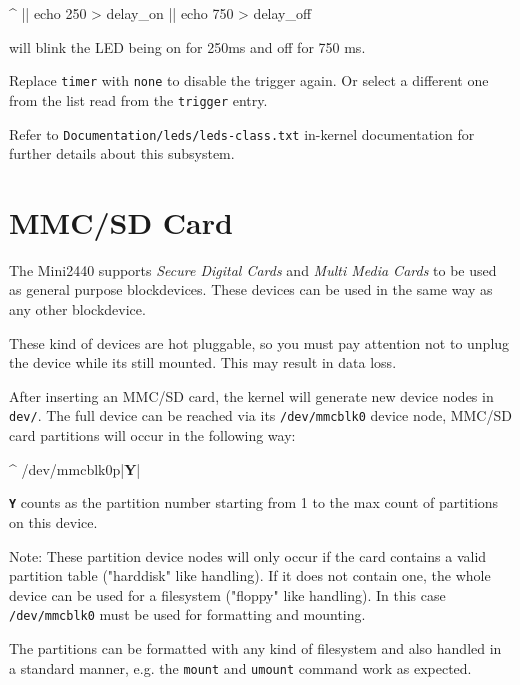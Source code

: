 \begin{ptxshell}[escapechar=|]{^}
|\LedPath| echo 250 > delay_on
|\LedPath| echo 750 > delay_off
\end{ptxshell}

will blink the LED being on for 250ms and off for 750 ms.

Replace \texttt{timer} with \texttt{none} to disable the trigger again. Or
select a different one from the list read from the \texttt{trigger} entry.

Refer to \texttt{Documentation/leds/leds-class.txt} in-kernel documentation for
further details about this subsystem.


\section{MMC/SD Card}					\label{sec:SDC}

The Mini2440 supports \textit{Secure Digital Cards} and
\textit{Multi Media Cards} to be used as general purpose blockdevices. These
devices can be used in the same way as any other blockdevice.

\begin{important}
These kind of devices are hot pluggable, so you must pay attention not to
unplug the device while its still mounted. This may result in data loss.
\end{important}

After inserting an MMC/SD card, the kernel will generate new device nodes in
\texttt{dev/}. The full device can be reached via its \texttt{/dev/mmcblk0}
device node, MMC/SD card partitions will occur in the following way:

\begin{ptxshell}[escapechar=|]{^}
/dev/mmcblk0p|\textbf{Y}|
\end{ptxshell}
\texttt{\textbf{Y}} counts as the partition number starting from 1 to the max
count of partitions on this device.

Note: These partition device nodes will only occur if the card contains a
valid partition table ("harddisk" like handling). If it does not contain one,
the whole device can be used for a filesystem ("floppy" like handling). In
this case \texttt{/dev/mmcblk0} must be used for formatting and mounting.

The partitions can be formatted with any kind of filesystem and also handled in
a standard manner, e.g. the \texttt{mount} and \texttt{umount} command work as
expected.

